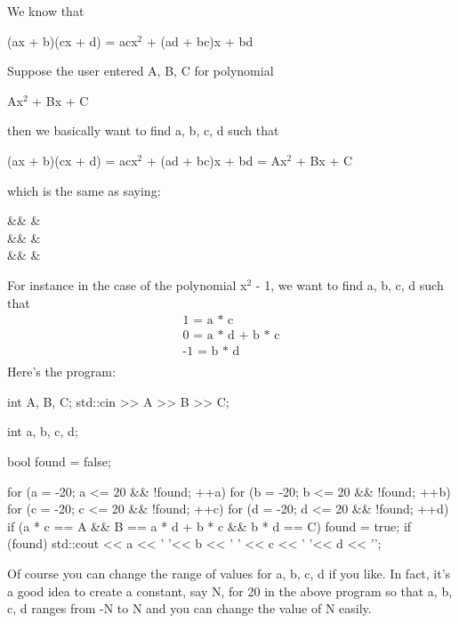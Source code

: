 \begin{console}
\begin{console}
We know that
\begin{center}
(ax + b)(cx + d) = acx$^2$ + (ad + bc)x + bd
\end{center}
Suppose the user entered A, B, C for polynomial
\begin{center}
Ax$^2$ + Bx + C
\end{center}
then we basically want to find a, b, c, d such that
\begin{center}
(ax + b)(cx + d) = acx$^2$ + (ad + bc)x + bd = Ax$^2$ + Bx + C
\end{center}
which is the same as saying:
\begin{flalign*}
&& &\\
&& &\\
&& &\\
\end{flalign*}
For instance in the case of the polynomial x$^{2}$ - 1, we
want to find a, b, c, d such that
\begin{align*}
\text{1 = a * c}\\
\text{0 = a * d + b * c}\\
\text{-1 = b * d}\\
\end{align*}
Here's the program:
\begin{console}
int A, B, C;
std::cin >> A >> B >> C;

int a, b, c, d;

bool found = false;

for (a = -20; a <= 20 && !found; ++a)
{   
    for (b = -20; b <= 20 && !found; ++b)
    {   
        for (c = -20; c <= 20 && !found; ++c)
        {
        for (d = -20; d <= 20 && !found; ++d)
        {
            if (a * c == A
                 && B == a * d + b * c
                 && b * d == C)
            {  
                    found = true;
            }
        }
     }
}
if (found)
{  
   std::cout << a << ' '<< b
             << ' ' << c << ' '<< d << '\n';
}
}
\end{console}
Of course you can change the range of values for a, b, c, d if you like.
In fact, it's a good idea to create a constant, say N,
for 20 in the above program so that a, b, c, d ranges from -N to N and
you can change the value of N easily.


\end{console}
\end{console}
